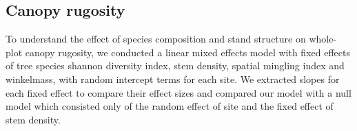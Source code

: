 \documentclass[11pt,a4paper]{article}
\begin{document}
\subsection{Canopy rugosity}

To understand the effect of species composition and stand structure on whole-plot canopy rugosity, we conducted a linear mixed effects model with fixed effects of tree species shannon diversity index, stem density, spatial mingling index and winkelmass, with random intercept terms for each site. We extracted slopes for each fixed effect to compare their effect sizes and compared our model with a null model which consisted only of the random effect of site and the fixed effect of stem density.

\printbibliography
\end{document}
